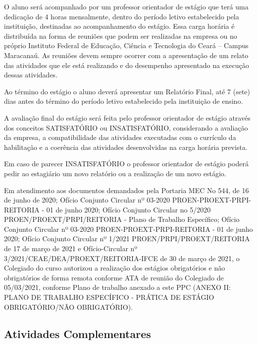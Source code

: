 \documentclass{paper}
\begin{document}
O aluno será acompanhado por um professor orientador de estágio que terá uma dedicação de 4 horas mensalmente, dentro do período letivo estabelecido pela instituição, destinadas ao acompanhamento do estágio. Essa carga horária é distribuída na forma de reuniões que podem ser realizadas na empresa ou no próprio Instituto Federal de Educação, Ciência e Tecnologia do Ceará – Campus Maracanaú. As reuniões devem sempre ocorrer com a apresentação de um relato das atividades que ele
está realizando e do desempenho apresentado na execução dessas atividades.

Ao término do estágio o aluno deverá apresentar um Relatório Final, até 7 (sete) dias antes do término do período letivo estabelecido pela instituição de ensino.

A avaliação final do estágio será feita pelo professor orientador de estágio através dos conceitos SATISFATÓRIO ou INSATISFATÓRIO, considerando a avaliação da empresa, a compatibilidade das atividades executadas com o currículo da habilitação e a coerência das atividades desenvolvidas na carga horária prevista.

Em caso de parecer INSATISFATÓRIO o professor orientador de estágio poderá pedir ao estagiário um novo relatório ou a realização de um novo estágio.

Em atendimento aos documentos demandados pela Portaria MEC No 544, de 16 de junho de 2020; Ofício Conjunto Circular nº 03-2020 PROEN-PROEXT-PRPI-REITORIA - 01 de junho 2020; Ofício Conjunto Circular no 5/2020 PROEN/PROEXT/PRPI/REITORIA - Plano de Trabalho Específico; Ofício Conjunto Circular nº 03-2020 PROEN-PROEXT-PRPI-REITORIA - 01 de junho 2020; Ofício Conjunto Circular nº 1/2021 PROEN/PRPI/PROEXT/REITORIA de 17 de março de 2021 e Ofício-Circular nº 3/2021/CEAE/DEA/PROEXT/REITORIA-IFCE de 30 de março de 2021, o Colegiado do curso autorizou a realização dos estágios obrigatórios e não obrigatórios de forma remota conforme ATA de reunião do Colegiado de 05/03/2021, conforme Plano de trabalho anexado a este PPC (ANEXO II: PLANO DE TRABALHO ESPECÍFICO - PRÁTICA DE ESTÁGIO OBRIGATÓRIO/NÃO OBRIGATÓRIO).

\subsection{Atividades Complementares}
\end{document}

